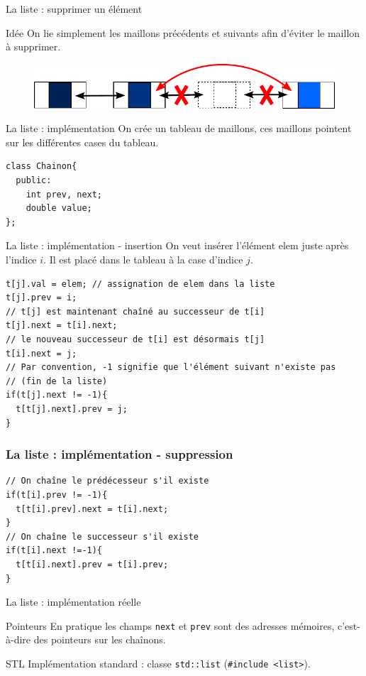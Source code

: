 \begin{frame}{La liste : supprimer un élément}
\begin{block}{Idée}
On lie simplement les maillons précédents et suivants afin d'éviter le maillon à supprimer.
\end{block}

\begin{figure}
\centering
\includegraphics[width=0.9 \linewidth]{./images/liste03.pdf}
\end{figure}
\end{frame}

\begin{frame}[fragile]{La liste : implémentation}
On crée un tableau de maillons, ces maillons pointent sur les différentes cases du tableau.
\begin{verbatim}
class Chainon{
  public:
    int prev, next;
    double value;
};
\end{verbatim}
\end{frame}

\begin{frame}[fragile]{La liste : implémentation - insertion}
On veut insérer l'élément $\text{elem}$ juste après l'indice $i$. Il est placé dans le tableau à la case d'indice $j$.
\begin{verbatim}
t[j].val = elem; // assignation de elem dans la liste
t[j].prev = i;
// t[j] est maintenant chaîné au successeur de t[i]
t[j].next = t[i].next;
// le nouveau successeur de t[i] est désormais t[j]
t[i].next = j;
// Par convention, -1 signifie que l'élément suivant n'existe pas
// (fin de la liste)
if(t[j].next != -1){
  t[t[j].next].prev = j;
}
\end{verbatim}
\end{frame}

\begin{frame}[fragile]
\frametitle{La liste : implémentation - suppression}
\begin{verbatim}
// On chaîne le prédécesseur s'il existe
if(t[i].prev != -1){
  t[t[i].prev].next = t[i].next;
}
// On chaîne le successeur s'il existe
if(t[i].next !=-1){
  t[t[i].next].prev = t[i].prev;
}
\end{verbatim}
\end{frame}

\begin{frame}{La liste : implémentation réelle}

\begin{block}{Pointeurs}
En pratique les champs \texttt{next} et \texttt{prev} sont des adresses mémoires, c'est-à-dire des pointeurs sur les chaînons.
\end{block}

\begin{exampleblock}{STL}
Implémentation standard : classe \texttt{std::list} (\texttt{\#include <list>}).
\end{exampleblock}

\end{frame}

